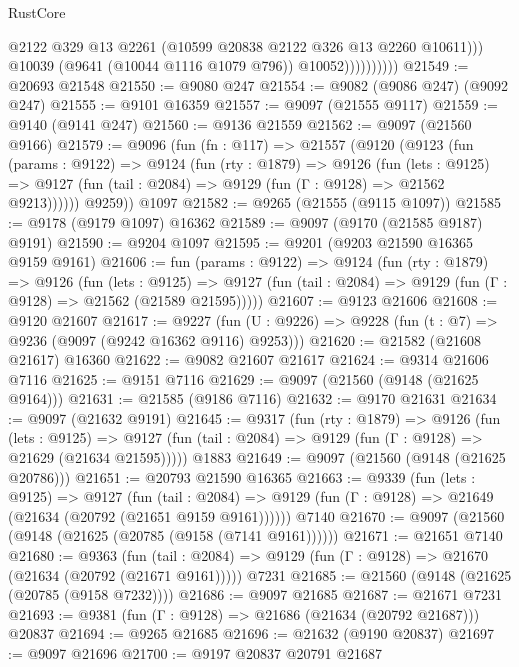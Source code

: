 \begin{lexlean}{RustCore}
\begin{coremodule}
                            @2122
                            @329
                            @13
                            @2261
                            (@10599 @20838 @2122 @326 @13 @2260 @10611)))
                        @10039
                        (@9641 (@10044 @1116 @1079 @796))
                        @10052))))))))))
@21549 := @20693 @21548
@21550 := @9080 @247
@21554 := @9082 (@9086 @247) (@9092 @247)
@21555 := @9101 @16359
@21557 := @9097 (@21555 @9117)
@21559 := @9140 (@9141 @247)
@21560 := @9136 @21559
@21562 := @9097 (@21560 @9166)
@21579 := @9096
    (fun (fn : @117) =>
    @21557
      (@9120
        (@9123
          (fun (params : @9122) =>
          @9124
            (fun (rty : @1879) =>
            @9126
              (fun (lets : @9125) =>
              @9127 (fun (tail : @2084) => @9129 (fun (Γ : @9128) => @21562 @9213))))))
        @9259))
    @1097
@21582 := @9265 (@21555 (@9115 @1097))
@21585 := @9178 (@9179 @1097) @16362
@21589 := @9097 (@9170 (@21585 @9187) @9191)
@21590 := @9204 @1097
@21595 := @9201 (@9203 @21590 @16365 @9159 @9161)
@21606 := fun (params : @9122) =>
  @9124
    (fun (rty : @1879) =>
    @9126
      (fun (lets : @9125) =>
      @9127 (fun (tail : @2084) => @9129 (fun (Γ : @9128) => @21562 (@21589 @21595)))))
@21607 := @9123 @21606
@21608 := @9120 @21607
@21617 := @9227
    (fun (U : @9226) => @9228 (fun (t : @7) => @9236 (@9097 (@9242 @16362 @9116) @9253)))
@21620 := @21582 (@21608 @21617) @16360
@21622 := @9082 @21607 @21617
@21624 := @9314 @21606 @7116
@21625 := @9151 @7116
@21629 := @9097 (@21560 (@9148 (@21625 @9164)))
@21631 := @21585 (@9186 @7116)
@21632 := @9170 @21631
@21634 := @9097 (@21632 @9191)
@21645 := @9317
    (fun (rty : @1879) =>
    @9126
      (fun (lets : @9125) =>
      @9127 (fun (tail : @2084) => @9129 (fun (Γ : @9128) => @21629 (@21634 @21595)))))
    @1883
@21649 := @9097 (@21560 (@9148 (@21625 @20786)))
@21651 := @20793 @21590 @16365
@21663 := @9339
    (fun (lets : @9125) =>
    @9127
      (fun (tail : @2084) =>
      @9129 (fun (Γ : @9128) => @21649 (@21634 (@20792 (@21651 @9159 @9161))))))
    @7140
@21670 := @9097 (@21560 (@9148 (@21625 (@20785 (@9158 (@7141 @9161))))))
@21671 := @21651 @7140
@21680 := @9363
    (fun (tail : @2084) => @9129 (fun (Γ : @9128) => @21670 (@21634 (@20792 (@21671 @9161)))))
    @7231
@21685 := @21560 (@9148 (@21625 (@20785 (@9158 @7232))))
@21686 := @9097 @21685
@21687 := @21671 @7231
@21693 := @9381 (fun (Γ : @9128) => @21686 (@21634 (@20792 @21687))) @20837
@21694 := @9265 @21685
@21696 := @21632 (@9190 @20837)
@21697 := @9097 @21696
@21700 := @9197 @20837 @20791 @21687

\end{coremodule}
\end{lexlean}
